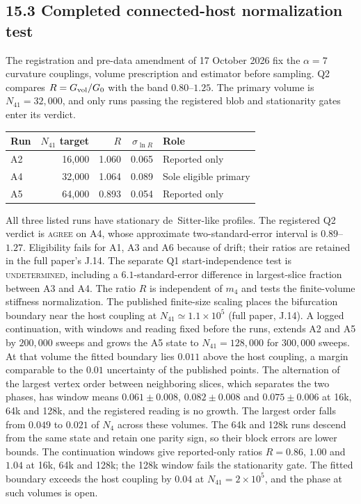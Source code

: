 \documentclass[11pt]{article}
\begin{document}
\subsection{15.3 Completed connected-host normalization test}

The registration and pre-data amendment of 17 October 2026 fix the
$\alpha=7$ curvature couplings, volume prescription and estimator before
sampling. Q2 compares $R=G_{\rm vol}/G_0$ with the band $0.80$--$1.25$.
The primary volume is $N_{41}=32{,}000$, and only runs passing the
registered blob and stationarity gates enter its verdict.

\begin{center}
\begin{tabular}{lrrrl}
\toprule
Run & $N_{41}$ target & $R$ & $\sigma_{\ln R}$ & Role\\
\midrule
A2 & 16,000 & 1.060 & 0.065 & Reported only\\
A4 & 32,000 & 1.064 & 0.089 & Sole eligible primary\\
A5 & 64,000 & 0.893 & 0.054 & Reported only\\
\bottomrule
\end{tabular}
\end{center}

All three listed runs have stationary de~Sitter-like profiles. The
registered Q2 verdict is \textsc{agree} on A4, whose approximate
two-standard-error interval is $0.89$--$1.27$. Eligibility fails for
A1, A3 and A6 because of drift; their ratios are retained in the full
paper's J.14. The separate Q1 start-independence test is
\textsc{undetermined}, including a $6.1$-standard-error difference
in largest-slice fraction between A3 and A4. The ratio $R$ is
independent of $m_4$ and tests the finite-volume stiffness normalization.
The published finite-size scaling places the bifurcation boundary near
the host coupling at $N_{41}\simeq1.1\times10^5$ (full paper, J.14).
A logged continuation, with windows and reading fixed before the runs,
extends A2 and A5 by $200{,}000$ sweeps and grows the A5 state to
$N_{41}=128{,}000$ for $300{,}000$ sweeps. At that volume the fitted
boundary lies $0.011$ above the host coupling, a margin comparable to
the $0.01$ uncertainty of the published points. The alternation of the
largest vertex order between neighboring slices, which separates the two
phases, has window means $0.061\pm0.008$, $0.082\pm0.008$ and
$0.075\pm0.006$ at 16k, 64k and 128k, and the registered reading is no
growth. The largest order falls from $0.049$ to $0.021$ of $N_4$ across these volumes. The 64k and 128k runs descend from the same state and retain one parity sign, so their block errors are lower bounds. The continuation windows give reported-only ratios
$R=0.86$, $1.00$ and $1.04$ at 16k, 64k and 128k; the 128k window fails
the stationarity gate. The fitted boundary exceeds the host coupling by
$0.04$ at $N_{41}=2\times10^5$, and the phase at such volumes is open.
\end{document}
